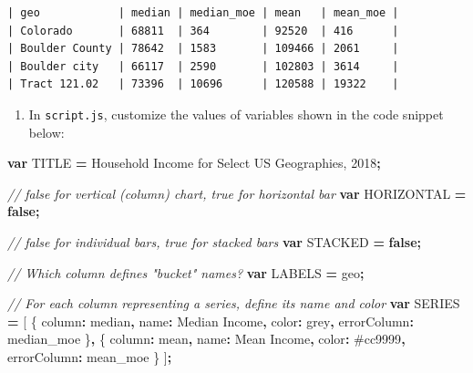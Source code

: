 \documentclass[
  english,
]{book}
\newenvironment{Shaded}{\begin{snugshade}}{\end{snugshade}}
\newcommand{\CommentTok}[1]{\textcolor[rgb]{0.56,0.35,0.01}{\textit{#1}}}
\newcommand{\DataTypeTok}[1]{\textcolor[rgb]{0.13,0.29,0.53}{#1}}
\newcommand{\KeywordTok}[1]{\textcolor[rgb]{0.13,0.29,0.53}{\textbf{#1}}}
\newcommand{\NormalTok}[1]{#1}
\newcommand{\OperatorTok}[1]{\textcolor[rgb]{0.81,0.36,0.00}{\textbf{#1}}}
\newcommand{\StringTok}[1]{\textcolor[rgb]{0.31,0.60,0.02}{#1}}
\providecommand{\tightlist}{%
  \setlength{\itemsep}{0pt}\setlength{\parskip}{0pt}}
\begin{document}
\begin{verbatim}
| geo            | median | median_moe | mean   | mean_moe |
| Colorado       | 68811  | 364        | 92520  | 416      |
| Boulder County | 78642  | 1583       | 109466 | 2061     |
| Boulder city   | 66117  | 2590       | 102803 | 3614     |
| Tract 121.02   | 73396  | 10696      | 120588 | 19322    |
\end{verbatim}

\begin{enumerate}
\def\labelenumi{\arabic{enumi}.}
\setcounter{enumi}{2}
\tightlist
\item
  In \texttt{script.js}, customize the values of variables shown in the code snippet below:
\end{enumerate}

\begin{Shaded}
\begin{Highlighting}[]
\KeywordTok{var}\NormalTok{ TITLE }\OperatorTok{=} \StringTok{\textquotesingle{}Household Income for Select US Geographies, 2018\textquotesingle{}}\OperatorTok{;}

\CommentTok{// \textasciigrave{}false\textasciigrave{} for vertical (column) chart, \textasciigrave{}true\textasciigrave{} for horizontal bar}
\KeywordTok{var}\NormalTok{ HORIZONTAL }\OperatorTok{=} \KeywordTok{false}\OperatorTok{;}

\CommentTok{// \textasciigrave{}false\textasciigrave{} for individual bars, \textasciigrave{}true\textasciigrave{} for stacked bars}
\KeywordTok{var}\NormalTok{ STACKED }\OperatorTok{=} \KeywordTok{false}\OperatorTok{;}  

\CommentTok{// Which column defines "bucket" names?}
\KeywordTok{var}\NormalTok{ LABELS }\OperatorTok{=} \StringTok{\textquotesingle{}geo\textquotesingle{}}\OperatorTok{;}

\CommentTok{// For each column representing a series, define its name and color}
\KeywordTok{var}\NormalTok{ SERIES }\OperatorTok{=}\NormalTok{ [}
\NormalTok{  \{}
    \DataTypeTok{column}\OperatorTok{:} \StringTok{\textquotesingle{}median\textquotesingle{}}\OperatorTok{,}
    \DataTypeTok{name}\OperatorTok{:} \StringTok{\textquotesingle{}Median Income\textquotesingle{}}\OperatorTok{,}
    \DataTypeTok{color}\OperatorTok{:} \StringTok{\textquotesingle{}grey\textquotesingle{}}\OperatorTok{,}
    \DataTypeTok{errorColumn}\OperatorTok{:} \StringTok{\textquotesingle{}median\_moe\textquotesingle{}}
\NormalTok{  \}}\OperatorTok{,}
\NormalTok{  \{}
    \DataTypeTok{column}\OperatorTok{:} \StringTok{\textquotesingle{}mean\textquotesingle{}}\OperatorTok{,}
    \DataTypeTok{name}\OperatorTok{:} \StringTok{\textquotesingle{}Mean Income\textquotesingle{}}\OperatorTok{,}
    \DataTypeTok{color}\OperatorTok{:} \StringTok{\textquotesingle{}\#cc9999\textquotesingle{}}\OperatorTok{,}
    \DataTypeTok{errorColumn}\OperatorTok{:} \StringTok{\textquotesingle{}mean\_moe\textquotesingle{}}
\NormalTok{  \}}
\NormalTok{]}\OperatorTok{;}


\end{Highlighting}
\end{Shaded}
\end{document}
